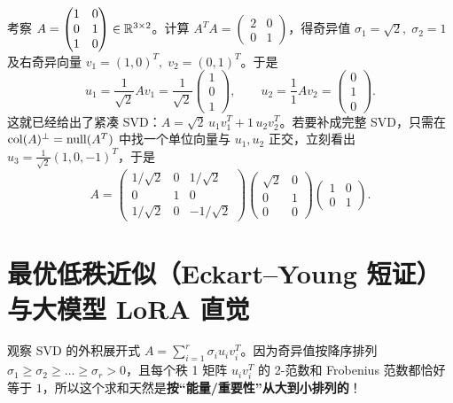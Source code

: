 \begin{example}
\label{ex:ch4-svd-3x2}
考察 $A = \begin{pmatrix} 1 & 0 \\ 0 & 1 \\ 1 & 0 \end{pmatrix} \in \mathbb{R}^{3\times 2}$。计算 $A^T A = \begin{pmatrix} 2 & 0 \\ 0 & 1 \end{pmatrix}$，得奇异值 $\sigma_1 = \sqrt{2},\; \sigma_2 = 1$ 及右奇异向量 $v_1 = (1,0)^T,\; v_2 = (0,1)^T$。于是
\[
  u_1 = \frac{1}{\sqrt{2}} A v_1 = \frac{1}{\sqrt{2}}\begin{pmatrix} 1 \\ 0 \\ 1 \end{pmatrix}, \qquad
  u_2 = \frac{1}{1} A v_2 = \begin{pmatrix} 0 \\ 1 \\ 0 \end{pmatrix}.
\]
这就已经给出了紧凑 SVD：$A = \sqrt{2}\,u_1 v_1^T + 1\,u_2 v_2^T$。若要补成完整 SVD，只需在 $\operatorname{col}(A)^\perp = \operatorname{null}(A^T)$ 中找一个单位向量与 $u_1, u_2$ 正交，立刻看出 $u_3 = \frac{1}{\sqrt{2}}(1,0,-1)^T$，于是
\[
  A = \begin{pmatrix}
    1/\sqrt{2} & 0 & 1/\sqrt{2} \\
    0 & 1 & 0 \\
    1/\sqrt{2} & 0 & -1/\sqrt{2}
  \end{pmatrix}
  \begin{pmatrix}
    \sqrt{2} & 0 \\
    0 & 1 \\
    0 & 0
  \end{pmatrix}
  \begin{pmatrix} 1 & 0 \\ 0 & 1 \end{pmatrix}.
\]
\end{example}

\section{最优低秩近似（Eckart--Young 短证）与大模型 LoRA 直觉}
\label{sec:ch4-eckart-young}

观察 SVD 的外积展开式 $A = \sum_{i=1}^r \sigma_i u_i v_i^T$。因为奇异值按降序排列 $\sigma_1 \ge \sigma_2 \ge \dots \ge \sigma_r > 0$，且每个秩 1 矩阵 $u_i v_i^T$ 的 2-范数和 Frobenius 范数都恰好等于 $1$，所以这个求和天然是\textbf{按“能量/重要性”从大到小排列的}！

